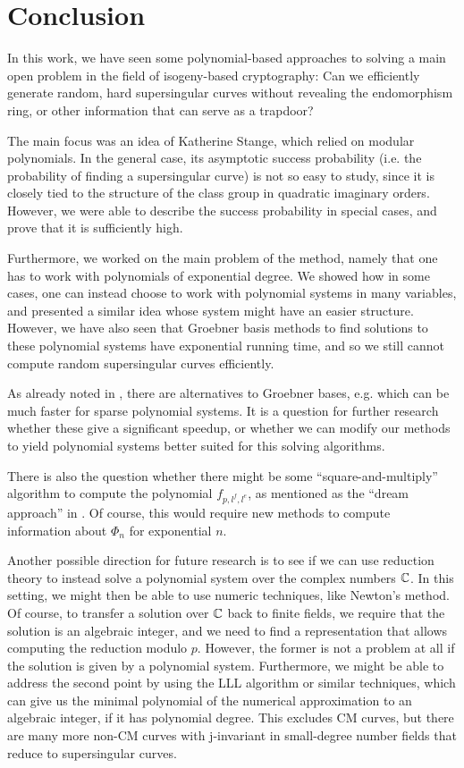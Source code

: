 \section{Conclusion}
In this work, we have seen some polynomial-based approaches to solving a main open problem in the field of isogeny-based cryptography:
Can we efficiently generate random, hard supersingular curves without revealing the endomorphism ring, or other information that can serve as a trapdoor?

The main focus was an idea of Katherine Stange, which relied on modular polynomials.
In the general case, its asymptotic success probability (i.e. the probability of finding a supersingular curve) is not so easy to study, since it is closely tied to the structure of the class group in quadratic imaginary orders.
However, we were able to describe the success probability in special cases, and prove that it is sufficiently high.

Furthermore, we worked on the main problem of the method, namely that one has to work with polynomials of exponential degree.
We showed how in some cases, one can instead choose to work with polynomial systems in many variables, and presented a similar idea whose system might have an easier structure.
However, we have also seen that Groebner basis methods to find solutions to these polynomial systems have exponential running time, and so we still cannot compute random supersingular curves efficiently.

As already noted in \cite{base_paper}, there are alternatives to Groebner bases, e.g. \cite{poly_system_solve_algorithm} which can be much faster for sparse polynomial systems.
It is a question for further research whether these give a significant speedup, or whether we can modify our methods to yield polynomial systems better suited for this solving algorithms.

There is also the question whether there might be some ``square-and-multiply'' algorithm to compute the polynomial $f_{p, l^f, l^e}$, as mentioned as the ``dream approach'' in \cite{base_paper}.
Of course, this would require new methods to compute information about $\Phi_n$ for exponential $n$.

Another possible direction for future research is to see if we can use reduction theory to instead solve a polynomial system over the complex numbers $\mathbb{C}$.
In this setting, we might then be able to use numeric techniques, like Newton's method.
Of course, to transfer a solution over $\mathbb{C}$ back to finite fields, we require that the solution is an algebraic integer, and we need to find a representation that allows computing the reduction modulo $p$.
However, the former is not a problem at all if the solution is given by a polynomial system.
Furthermore, we might be able to address the second point by using the LLL algorithm or similar techniques, which can give us the minimal polynomial of the numerical approximation to an algebraic integer, if it has polynomial degree.
This excludes CM curves, but there are many more non-CM curves with j-invariant in small-degree number fields that reduce to supersingular curves.

